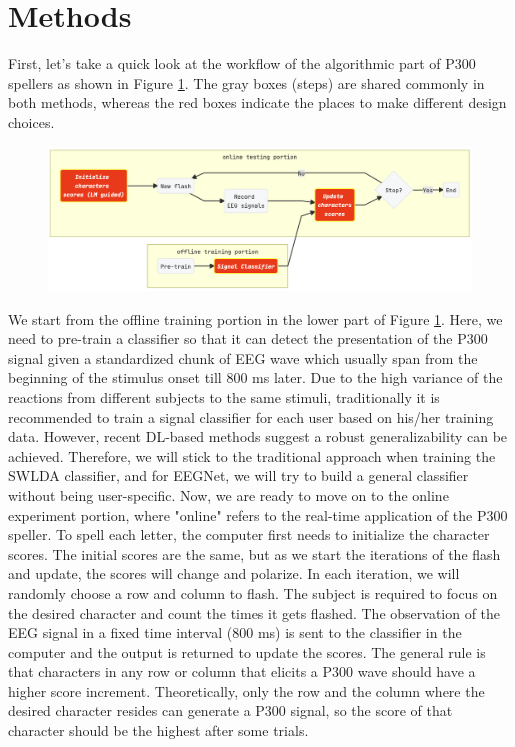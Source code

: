 \documentclass{article}
\begin{document}
\section{Methods} \label{Methods}
First, let's take a quick look at the workflow of the algorithmic part of P300 spellers as shown in Figure \ref{fig:3}. The gray boxes (steps) are shared commonly in both methods, whereas the red boxes indicate the places to make different design choices. 

\vspace{-3mm}
\begin{figure}[H]
	\centering
	\includegraphics[width=1.0\linewidth]{framework.jpg}
	\label{fig:3}
\end{figure}

\vspace{-3mm}
We start from the offline training portion in the lower part of Figure \ref{fig:3}. Here, we need to pre-train a classifier so that it can detect the presentation of the P300 signal given a standardized chunk of EEG wave which usually span from the beginning of the stimulus onset till $800$ ms later. Due to the high variance of the reactions from different subjects to the same stimuli, traditionally it is recommended to train a signal classifier for each user based on his/her training data. However, recent DL-based methods suggest a robust generalizability can be achieved. Therefore, we will stick to the traditional approach when training the SWLDA classifier, and for EEGNet, we will try to build a general classifier without being user-specific. Now, we are ready to move on to the online experiment portion, where "online" refers to the real-time application of the P300 speller. To spell each letter, the computer first needs to initialize the character scores. The initial scores are the same, but as we start the iterations of the flash and update, the scores will change and polarize. In each iteration, we will randomly choose a row and column to flash. The subject is required to focus on the desired character and count the times it gets flashed. The observation of the EEG signal in a fixed time interval (800 ms) is sent to the classifier in the computer and the output is returned to update the scores. The general rule is that characters in any row or column that elicits a P300 wave should have a higher score increment. Theoretically, only the row and the column where the desired character resides can generate a P300 signal, so the score of that character should be the highest after some trials.\\
\end{document}
